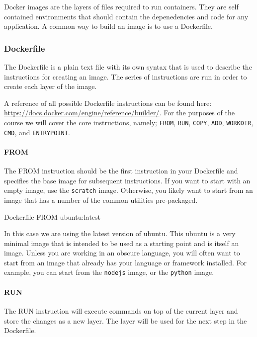 \documentclass{csse4400}
\begin{document}
Docker images are the layers of files required to run containers.
They are self contained environments that should contain the depenedencies and code for any application.
A common way to build an image is to use a Dockerfile.

\subsubsection{Dockerfile}

The Dockerfile is a plain text file with its own syntax that is used to describe the instructions for creating an image.
The series of instructions are run in order to create each layer of the image.

A reference of all possible Dockerfile instructions can be found here: \url{https://docs.docker.com/engine/reference/builder/}.
For the purposes of the course we will cover the core instructions, namely;
\texttt{FROM}, \texttt{RUN}, \texttt{COPY}, \texttt{ADD}, \texttt{WORKDIR}, \texttt{CMD}, and \texttt{ENTRYPOINT}.

\paragraph{FROM}
The FROM instruction should be the first instruction in your Dockerfile and specifies the base image for subsequent instructions.
If you want to start with an empty image,
use the \texttt{scratch} image.
Otherwise, you likely want to start from an image that has a number of the common utilities pre-packaged.

\begin{code}[language=docker,numbers=none]{Dockerfile}
FROM ubuntu:latest
\end{code}

In this case we are using the latest version of ubuntu.
This ubuntu is a very minimal image that is intended to be used as a starting point and is itself an image.
Unless you are working in an obscure language,
you will often want to start from an image that already has your language or framework installed.
For example, you can start from the \texttt{nodejs} image,
or the \texttt{python} image.


\paragraph{RUN}
The RUN instruction will execute commands on top of the current layer and store the changes as a new layer.
The layer will be used for the next step in the Dockerfile.
\end{document}
